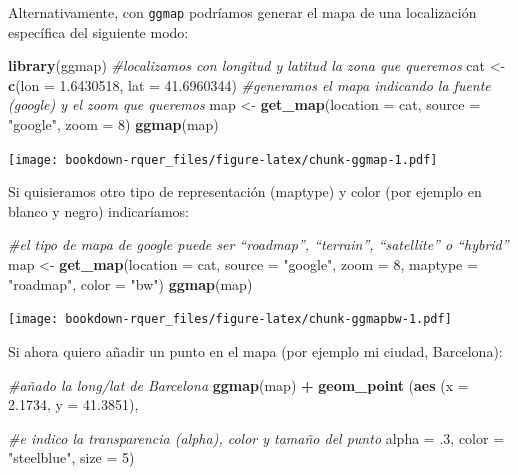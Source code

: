 \documentclass[]{book}
\newenvironment{Shaded}{\begin{snugshade}}{\end{snugshade}}
\newcommand{\CommentTok}[1]{\textcolor[rgb]{0.56,0.35,0.01}{\textit{#1}}}
\newcommand{\DataTypeTok}[1]{\textcolor[rgb]{0.13,0.29,0.53}{#1}}
\newcommand{\DecValTok}[1]{\textcolor[rgb]{0.00,0.00,0.81}{#1}}
\newcommand{\FloatTok}[1]{\textcolor[rgb]{0.00,0.00,0.81}{#1}}
\newcommand{\KeywordTok}[1]{\textcolor[rgb]{0.13,0.29,0.53}{\textbf{#1}}}
\newcommand{\NormalTok}[1]{#1}
\newcommand{\OperatorTok}[1]{\textcolor[rgb]{0.81,0.36,0.00}{\textbf{#1}}}
\newcommand{\StringTok}[1]{\textcolor[rgb]{0.31,0.60,0.02}{#1}}
\theoremstyle{definition}
\theoremstyle{definition}
\theoremstyle{definition}
\theoremstyle{remark}
\begin{document}
Alternativamente, con \texttt{ggmap} podríamos generar el mapa de una
localización específica del siguiente modo:

\begin{Shaded}
\begin{Highlighting}[]
\KeywordTok{library}\NormalTok{(ggmap)}
\CommentTok{#localizamos con longitud y latitud la zona que queremos}
\NormalTok{cat <-}\StringTok{ }\KeywordTok{c}\NormalTok{(}\DataTypeTok{lon =} \FloatTok{1.6430518}\NormalTok{, }\DataTypeTok{lat =} \FloatTok{41.6960344}\NormalTok{)}
\CommentTok{#generamos el mapa indicando la fuente (google) y el zoom que queremos}
\NormalTok{map <-}\StringTok{ }\KeywordTok{get_map}\NormalTok{(}\DataTypeTok{location =}\NormalTok{ cat, }\DataTypeTok{source =} \StringTok{"google"}\NormalTok{, }\DataTypeTok{zoom =} \DecValTok{8}\NormalTok{)}
\KeywordTok{ggmap}\NormalTok{(map)}
\end{Highlighting}
\end{Shaded}

\texttt{[image: bookdown-rquer\_files/figure-latex/chunk-ggmap-1.pdf]}

Si quisieramos otro tipo de representación (maptype) y color (por
ejemplo en blanco y negro) indicaríamos:

\begin{Shaded}
\begin{Highlighting}[]
\CommentTok{#el tipo de mapa de google puede ser “roadmap”, “terrain”, “satellite” o “hybrid”}
\NormalTok{map <-}\StringTok{ }\KeywordTok{get_map}\NormalTok{(}\DataTypeTok{location =}\NormalTok{ cat, }\DataTypeTok{source =} \StringTok{"google"}\NormalTok{, }\DataTypeTok{zoom =} \DecValTok{8}\NormalTok{, }\DataTypeTok{maptype =} \StringTok{"roadmap"}\NormalTok{, }\DataTypeTok{color =} \StringTok{"bw"}\NormalTok{)}
\KeywordTok{ggmap}\NormalTok{(map)}
\end{Highlighting}
\end{Shaded}

\texttt{[image: bookdown-rquer\_files/figure-latex/chunk-ggmapbw-1.pdf]}

Si ahora quiero añadir un punto en el mapa (por ejemplo mi ciudad,
Barcelona):

\begin{Shaded}
\begin{Highlighting}[]
\CommentTok{#añado la long/lat de Barcelona}
\KeywordTok{ggmap}\NormalTok{(map) }\OperatorTok{+}\StringTok{ }\KeywordTok{geom_point}\NormalTok{ (}\KeywordTok{aes}\NormalTok{ (}\DataTypeTok{x =} \FloatTok{2.1734}\NormalTok{, }\DataTypeTok{y =} \FloatTok{41.3851}\NormalTok{),  }
                         
\CommentTok{#e indico la transparencia (alpha), color y tamaño del punto}
\DataTypeTok{alpha =} \FloatTok{.3}\NormalTok{, }\DataTypeTok{color =} \StringTok{"steelblue"}\NormalTok{, }\DataTypeTok{size =} \DecValTok{5}\NormalTok{)}
\end{Highlighting}
\end{Shaded}
\end{document}
